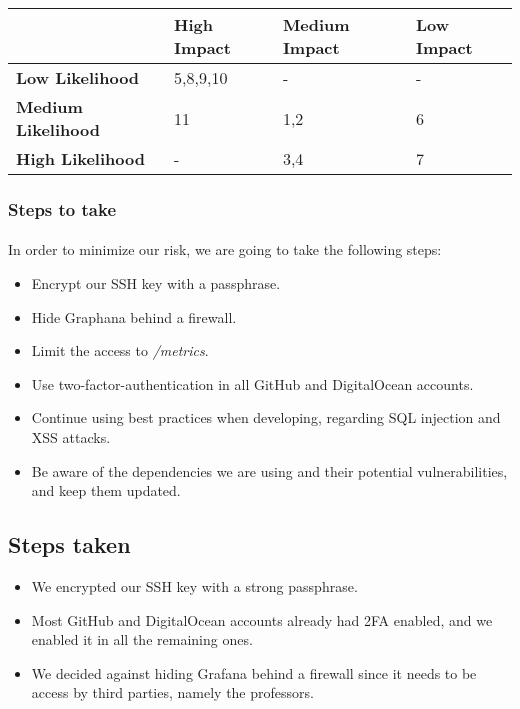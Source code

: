 \begin{tabular}{|l|l|l|l|}
	\hline
	                           & \textbf{High Impact} & \textbf{Medium Impact} & \textbf{Low Impact} \\ \hline
	\textbf{Low Likelihood}    & 5,8,9,10             & -                      & -                   \\ \hline
	\textbf{Medium Likelihood} & 11                   & 1,2                    & 6                   \\ \hline
	\textbf{High Likelihood}   & -                    & 3,4                    & 7                   \\ \hline
\end{tabular}

\subsubsection{Steps to take}
\paragraph{} In order to minimize our risk, we are going to take the following steps:
\begin{itemize}
	\item Encrypt our SSH key with a passphrase.%
	\item Hide Graphana behind a firewall.
	\item Limit the access to \textit{/metrics}.
	\item Use two-factor-authentication in all GitHub and DigitalOcean accounts.%
	\item Continue using best practices when developing, regarding SQL injection and XSS attacks.
	\item Be aware of the dependencies we are using and their potential vulnerabilities, and keep them updated.
\end{itemize}

\subsection{Steps taken}

\begin{itemize}
	\item We encrypted our SSH key with a strong passphrase.%
	\item Most GitHub and DigitalOcean accounts already had 2FA enabled, and we enabled it in all the remaining ones.
	\item We decided against hiding Grafana behind a firewall since it needs to be access by third parties, namely the professors.
\end{itemize}

